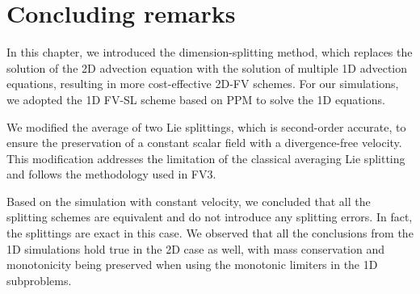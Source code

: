 %


\section{Concluding remarks}
In this chapter, we introduced the dimension-splitting method, 
which replaces the solution of the 2D advection equation with the
solution of multiple 1D advection equations, resulting in more cost-effective 2D-FV schemes. 
For our simulations, we adopted the 1D FV-SL scheme based on PPM to solve the 1D equations.

We modified the average of two Lie splittings, which is second-order accurate,
to ensure the preservation of a constant scalar field with a divergence-free velocity.
This modification addresses the limitation of the classical averaging
Lie splitting and follows the methodology used in FV3.

Based on the simulation with constant velocity, we concluded that all the splitting schemes
are equivalent and do not introduce any splitting errors. In fact, the splittings are exact in this case.
We observed that all the conclusions from the 1D simulations hold true in the 2D case as well,
with mass conservation and monotonicity being preserved when using the monotonic limiters in the 1D subproblems.

